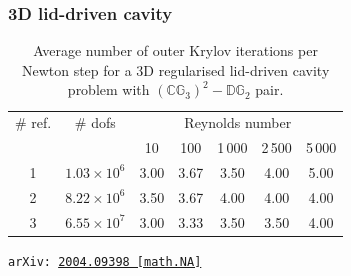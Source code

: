\documentclass[presentation,aspectratio=43, 10pt]{beamer}
\newcommand{\arxivlink}[2]{{\texttt{arXiv:\,\href{https://arxiv.org/abs/#1}{#1\,[#2]}}}}
\begin{document}
\begin{frame}[fragile,t]
\begin{overlayarea}{\textwidth}{0.4\textheight}
\begin{onlyenv}
\begin{columns}
\begin{column}{0.4\textwidth}
\begin{center}
      \end{center}
    \end{column}
  \end{columns}
    \end{onlyenv}
  \end{overlayarea}
\end{frame}
\begin{frame}
  \frametitle{3D lid-driven cavity}
  \begin{table}[htbp]
    \centering
    \begin{tabular}{cc|ccccc}
      \toprule
      \# ref. & \# dofs & \multicolumn{5}{c}{Reynolds number} \\
              && 10 & 100 & 1\,000 & 2\,500 & 5\,000 \\
      \midrule
      1   & $1.03\times 10^6$     & 3.00  & 3.67  & 3.50 & 4.00 & 5.00\\
      2   & $8.22\times 10^6$     & 3.50  & 3.67  & 4.00 & 4.00 & 4.00\\
      3   & $6.55\times 10^7$     & 3.00  & 3.33  & 3.50 & 3.50 & 4.00\\
      \bottomrule
    \end{tabular}
    \caption{Average number of outer Krylov iterations per Newton step for a
      3D regularised lid-driven cavity problem with
      $(\mathbb{CG}_3)^{2}-\mathbb{DG}_2$ pair.}
  \end{table}
  
  {\raggedleft \scriptsize
    \textcite{Farrell:2021a}
    \arxivlink{2004.09398}{math.NA}\par}
\end{frame}
\end{document}
